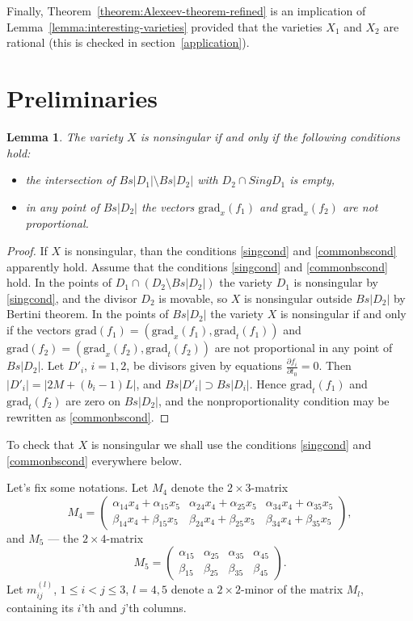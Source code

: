 \documentclass[12pt]{amsart}
\makeatletter
\newcommand{\symbitem}[1]{\item[#1]%
\renewcommand{\@currentlabel}{#1}\ignorespaces}
\newtheorem{lemma}[equation]{Lemma}
\theoremstyle{definition}
\theoremstyle{remark}
\makeatother
\begin{document}
Finally, Theorem~\ref{theorem:Alexeev-theorem-refined} is an implication
of Lemma~\ref{lemma:interesting-varieties} provided that the varieties 
$X_1$ and  $X_2$ are rational (this is checked in section~\ref{application}).


\section{Preliminaries}

\begin{lemma}
The variety $X$ is nonsingular if and only if the following conditions hold:
\begin{itemize}
\symbitem{$(*)$}\label{singcond} 
the intersection of $Bs|D_1|\setminus Bs|D_2|$ with $D_2\cap Sing D_1$ is empty,
\symbitem{$(**)$}\label{commonbscond}  
in any point of $Bs|D_2|$ 
the vectors ${\mathrm{grad}_x}(f_1)$ and ${\mathrm{grad}_x}(f_2)$ are not 
proportional.
\end{itemize}
\end{lemma}
\begin{proof}
If $X$ is nonsingular, than the conditions \ref{singcond} and 
\ref{commonbscond} apparently hold.
Assume that the conditions \ref{singcond} and \ref{commonbscond} hold. 
In the points of
$D_1\cap (D_2\setminus Bs|D_2|)$ the variety $D_1$ is nonsingular by
\ref{singcond}, and the divisor $D_2$ is movable, so $X$ is nonsingular 
outside $Bs|D_2|$ by Bertini theorem. In the points of $Bs|D_2|$
the variety $X$ is nonsingular if and only if the vectors
${\mathrm{grad}}(f_1)=({\mathrm{grad}_x}(f_1), {\mathrm{grad}}_t(f_1))$ and 
${\mathrm{grad}}(f_2)=({\mathrm{grad}_x}(f_2), {\mathrm{grad}}_t(f_2))$ 
are not proportional in any point of $Bs|D_2|$.
Let $D'_i$, $i=1, 2$, be divisors given by equations 
$\frac{\partial f_i}{\partial t_0}=0$. Then $|D'_i|=|2M+(b_i-1)L|$, and
$Bs|D'_i|\supset Bs|D_i|$.
Hence ${\mathrm{grad}}_t(f_1)$ and ${\mathrm{grad}}_t(f_2)$ are zero
on $Bs|D_2|$, and the nonproportionality condition may be rewritten as
\ref{commonbscond}.
\end{proof}

To check that $X$ is nonsingular we shall use the conditions
\ref{singcond} and \ref{commonbscond} everywhere below. 

Let's fix some notations. Let $M_4$ denote the $2\times 3$-matrix
$$M_4=\left(
\begin{array}{ccc}
\alpha_{14}x_4+\alpha_{15}x_5&\alpha_{24}x_4+\alpha_{25}x_5&
\alpha_{34}x_4+\alpha_{35}x_5\\
\beta_{14}x_4+\beta_{15}x_5&\beta_{24}x_4+\beta_{25}x_5&
\beta_{34}x_4+\beta_{35}x_5
\end{array}
\right),$$
and $M_5$ --- the $2\times 4$-matrix
$$M_5=\left(
\begin{array}{cccc}
\alpha_{15}&\alpha_{25}&\alpha_{35}&\alpha_{45}\\
\beta_{15}&\beta_{25}&\beta_{35}&\beta_{45}
\end{array}
\right).$$
Let $m^{(l)}_{ij}$, $1\leqslant i< j\leqslant 3$, $l=4, 5$ denote a 
$2\times 2$-minor of the matrix $M_l$, containing its $i$'th and $j$'th columns.
\end{document}
